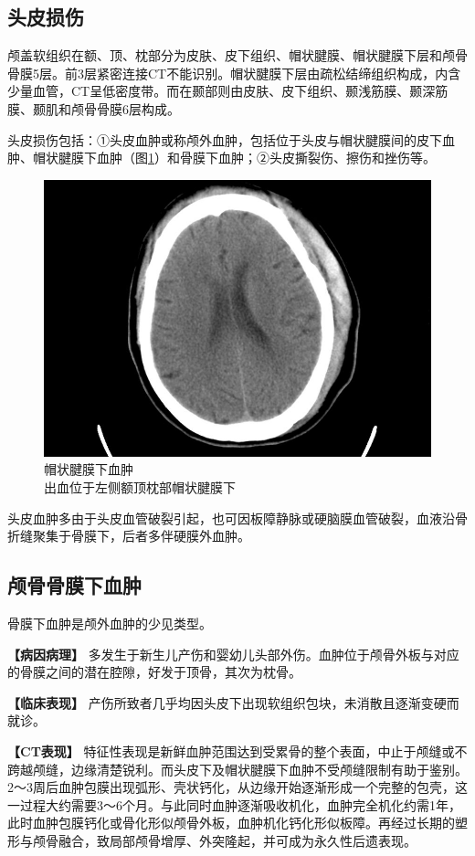 \subsection{头皮损伤}

颅盖软组织在额、顶、枕部分为皮肤、皮下组织、帽状腱膜、帽状腱膜下层和颅骨骨膜5层。前3层紧密连接CT不能识别。帽状腱膜下层由疏松结缔组织构成，内含少量血管，CT呈低密度带。而在颞部则由皮肤、皮下组织、颞浅筋膜、颞深筋膜、颞肌和颅骨骨膜6层构成。

头皮损伤包括：①头皮血肿或称颅外血肿，包括位于头皮与帽状腱膜间的皮下血肿、帽状腱膜下血肿（图\ref{fig2-29}）和骨膜下血肿；②头皮撕裂伤、擦伤和挫伤等。

\begin{figure}[!htbp]
 \centering
 \includegraphics[width=.7\textwidth,height=\textheight,keepaspectratio]{./images/Image00048.jpg}
 \captionsetup{justification=centering}
 \caption{帽状腱膜下血肿\\{\small 出血位于左侧额顶枕部帽状腱膜下}}
 \label{fig2-29}
  \end{figure} 

头皮血肿多由于头皮血管破裂引起，也可因板障静脉或硬脑膜血管破裂，血液沿骨折缝聚集于骨膜下，后者多伴硬膜外血肿。

\subsection{颅骨骨膜下血肿}

骨膜下血肿是颅外血肿的少见类型。

\textbf{【病因病理】}
多发生于新生儿产伤和婴幼儿头部外伤。血肿位于颅骨外板与对应的骨膜之间的潜在腔隙，好发于顶骨，其次为枕骨。

\textbf{【临床表现】}
产伤所致者几乎均因头皮下出现软组织包块，未消散且逐渐变硬而就诊。

\textbf{【CT表现】}
特征性表现是新鲜血肿范围达到受累骨的整个表面，中止于颅缝或不跨越颅缝，边缘清楚锐利。而头皮下及帽状腱膜下血肿不受颅缝限制有助于鉴别。2～3周后血肿包膜出现弧形、壳状钙化，从边缘开始逐渐形成一个完整的包壳，这一过程大约需要3～6个月。与此同时血肿逐渐吸收机化，血肿完全机化约需1年，此时血肿包膜钙化或骨化形似颅骨外板，血肿机化钙化形似板障。再经过长期的塑形与颅骨融合，致局部颅骨增厚、外突隆起，并可成为永久性后遗表现。

